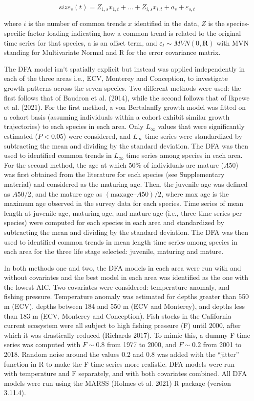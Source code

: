 \documentclass[
]{article}
\begin{document}
\[
size_s(t)= Z_{1,s}x_{1,t}+\dots+Z_{i,s}x_{i,t}+ a_s+\varepsilon_{s,t} 
\]

where \(i\) is the number of common trends \(x\) identified in the data,
\(Z\) is the species-specific factor loading indicating how a common
trend is related to the original time series for that species, a is an
offset term, and \(\varepsilon_t \sim MVN(0, \textbf{R})\) with MVN
standing for Multivariate Normal and R for the error covariance matrix.

The DFA model isn't spatially explicit but instead was applied
independently in each of the three areas i.e., ECV, Monterey and
Conception, to investigate growth patterns across the seven species. Two
different methods were used: the first follows that of Baudron et al.
(2014), while the second follows that of Ikpewe et al. (2021). For the
first method, a von Bertalanffy growth model was fitted on a cohort
basis (assuming individuals within a cohort exhibit similar growth
trajectories) to each species in each area. Only \(L_{\infty}\) values
that were significantly estimated (\(P<0.05\)) were considered, and
\(L_{\infty}\) time series were standardized by subtracting the mean and
dividing by the standard deviation. The DFA was then used to identified
common trends in \(L_{\infty}\) time series among species in each area.
For the second method, the age at which 50\% of individuals are mature
(\(A50\)) was first obtained from the literature for each species (see
Supplementary material) and considered as the maturing age. Then, the
juvenile age was defined as \(A50/2\), and the mature age as
\((\mathrm{max age} – A50)/2\), where max age is the maximum age
observed in the survey data for each species. Time series of mean length
at juvenile age, maturing age, and mature age (i.e., three time series
per species) were computed for each species in each area and
standardized by subtracting the mean and dividing by the standard
deviation. The DFA was then used to identified common trends in mean
length time series among species in each area for the three life stage
selected: juvenile, maturing and mature.

In both methods one and two, the DFA models in each area were run with
and without covariates and the best model in each area was identified as
the one with the lowest AIC. Two covariates were considered: temperature
anomaly, and fishing pressure. Temperature anomaly was estimated for
depths greater than 550 m (ECV), depths between 184 and 550 m (ECV and
Monterey), and depths less than 183 m (ECV, Monterey and Conception).
Fish stocks in the California current ecosystem were all subject to high
fishing pressure (F) until 2000, after which it was drastically reduced
(Richards 2017). To mimic this, a dummy F time series was computed with
\(F \sim 0.8\) from 1977 to 2000, and \(F \sim 0.2\) from 2001 to 2018.
Random noise around the values 0.2 and 0.8 was added with the ``jitter''
function in R to make the F time series more realistic. DFA models were
run with temperature and F separately, and with both covariates
combined. All DFA models were run using the MARSS (Holmes et al. 2021) R
package (version 3.11.4).
\end{document}
